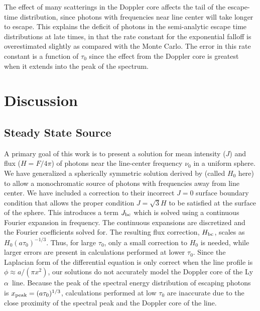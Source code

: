 \documentclass[linenumbers]{aastex63}
\newcommand\lya{Ly$\alpha$\ }
\begin{document}
The effect of many scatterings in the Doppler core affects the tail of the escape-time distribution, since photons with frequencies near line center will take longer to escape. This explains the deficit of photons in the semi-analytic escape time distributions at late times, in that the rate constant for the exponential falloff is overestimated slightly as compared with the Monte Carlo. The error in this rate constant is a function of $\tau_0$ since the effect from the Doppler core is greatest when it extends into the peak of the spectrum.

\section{Discussion}

\subsection{Steady State Source}
A primary goal of this work is to present a solution for mean intensity ($J$) and flux ($H = F/4\pi$) of photons near the line-center frequency $\nu_0$ in a uniform sphere. We have generalized a spherically symmetric solution derived by \cite{2006ApJ...649...14D} (called $H_0$ here) to allow a monochromatic source of photons with frequencies away from line center. We have included a correction to their incorrect $J=0$ surface boundary condition that allows the proper condition $J=\sqrt{3}H$ to be satisfied at the surface of the sphere. This introduces a term $J_{\rm bc}$ which is solved using a continuous Fourier expansion in frequency. The continuous expansions are discretized and the Fourier coefficients solved for. The resulting flux correction, $H_{\rm bc}$, scales as $H_0(a\tau_0)^{-1/3}$. Thus, for large $\tau_0$, only a small correction to $H_0$ is needed, while larger errors are present in calculations performed at lower $\tau_0$. Since the Laplacian form of the differential equation is only correct when the line profile is $\phi \approx a/(\pi x^2)$, our solutions do not accurately model the Doppler core of the \lya line. Because the peak of the spectral energy distribution of escaping photons is $x_{\rm peak} = (a\tau_0)^{1/3}$, calculations performed at low $\tau_0$ are inaccurate due to the close proximity of the spectral peak and the Doppler core of the line.
\end{document}
